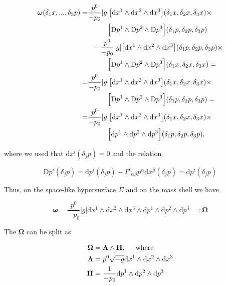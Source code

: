 \begin{align}
\boldsymbol{\omega}(\delta_1 x,...,\delta_3 p) =& \frac{p^0}{-p_0}|g|\big[\text{d}x^1\wedge\text{d}x^2\wedge\text{d}x^3\big](\delta_{1}x,\delta_{2}x,\delta_{3}x)\times \\
& \hspace{10mm} \Big[\text{D}p^1\wedge\text{D}p^2\wedge\text{D}p^3\Big](\delta_1 p, \delta_2 p, \delta_3 p) \\
& \hspace{2mm} -\frac{p^0}{-p_0}|g|\big[\text{d}x^1\wedge\text{d}x^2\wedge\text{d}x^3\big](\delta_{1}p,\delta_{2}p,\delta_{3}p)\times \\
& \hspace{10mm} \Big[\text{D}p^1\wedge\text{D}p^2\wedge\text{D}p^3\Big](\delta_1 x, \delta_2 x, \delta_3 x) = \\
=& \frac{p^0}{-p_0}|g|\big[\text{d}x^1\wedge\text{d}x^2\wedge\text{d}x^3\big](\delta_{1}x,\delta_{2}x,\delta_{3}x)\times \\
& \hspace{10mm} \Big[\text{D}p^1\wedge\text{D}p^2\wedge\text{D}p^3\Big](\delta_1 p, \delta_2 p, \delta_3 p) = \\
=& \frac{p^0}{-p_0}|g|\big[\text{d}x^1\wedge\text{d}x^2\wedge\text{d}x^3\big](\delta_{1}x,\delta_{2}x,\delta_{3}x)\times \\
& \hspace{10mm} \Big[\text{d}p^1\wedge\text{d}p^2\wedge\text{d}p^3\Big](\delta_1 p, \delta_2 p, \delta_3 p), \\
\end{align}

where we used that $\text{d}x^i(\delta_j p)=0$ and the relation

\begin{equation}
\text{D}p^{i}(\delta_j p) = \text{d}p^{i}(\delta_j p) - {\Gamma^i}_{\alpha\beta}p^{\alpha}\text{d}x^{\beta}(\delta_j p) = \text{d}p^i(\delta_j p)
\end{equation}

Thus, on the space-like hypersurface $\Sigma$ and on the mass shell we have

\begin{equation}
\boldsymbol{\omega} = \frac{p^0}{-p_0}|g|\text{d}x^1\wedge\text{d}x^2\wedge\text{d}x^3\wedge\text{d}p^1\wedge\text{d}p^2\wedge\text{d}p^3 =: \boldsymbol{\Omega}
\end{equation}

The $\boldsymbol{\Omega}$ can be split as 

\begin{align}
\boldsymbol{\Omega} &= \boldsymbol{\Lambda} \wedge \boldsymbol{\Pi}, \hspace{5mm} \text{where} \\
\boldsymbol{\Lambda} &= p^0 \sqrt{-g}\text{d}x^1\wedge\text{d}x^2\wedge\text{d}x^3 \\
\boldsymbol{\Pi} &=  \frac{1}{-p_0}\text{d}p^1\wedge\text{d}p^2\wedge\text{d}p^3
\end{align}


